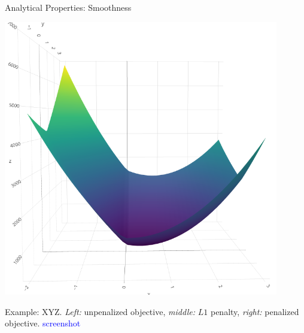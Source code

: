 \begin{vbframe}{Analytical Properties: Smoothness}
\begin{minipage}[c]{0.3\textwidth}
\end{minipage}%
\begin{minipage}[c]{0.05\textwidth}
  \phantom{foo}
\end{minipage}%
\begin{minipage}[c]{0.3\textwidth}
  \includegraphics[width=0.9\textwidth]{figure/lasso_penalized}
\end{minipage}%

\tiny Example: XYZ. \textit{Left:} unpenalized objective, \textit{middle:}
$L1$ penalty, \textit{right:} penalized objective. \textcolor{blue}{screenshot}

\end{vbframe}


